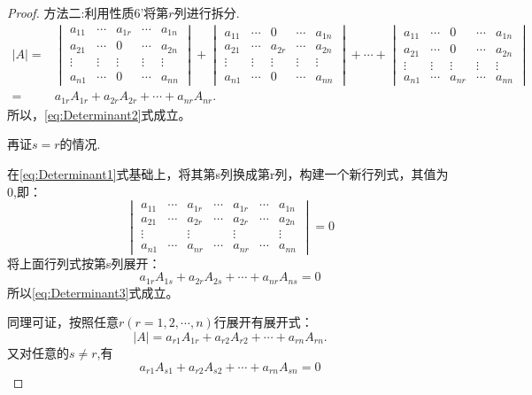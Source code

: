 \begin{proof}
  方法二:利用性质6'将第$r$列进行拆分.
  \begin{align*}
      |A| = &
    \begin{vmatrix}
    a_{11} & \cdots & a_{1r}& \cdots & a_{1n}\\
    a_{21} & \cdots & 0 & \cdots & a_{2n}\\
    \vdots & \vdots & \vdots & \vdots & \vdots\\
    a_{n1} & \cdots & 0 & \cdots &a_{nn}
    \end{vmatrix} +
    \begin{vmatrix}
    a_{11} & \cdots & 0 & \cdots & a_{1n}\\
    a_{21} & \cdots & a_{2r} & \cdots & a_{2n}\\
    \vdots & \vdots & \vdots & \vdots & \vdots\\
    a_{n1} & \cdots & 0 & \cdots &a_{nn}
  \end{vmatrix} + \cdots +
  \begin{vmatrix}
    a_{11} & \cdots & 0 & \cdots & a_{1n}\\
    a_{21} & \cdots & 0 & \cdots & a_{2n}\\
    \vdots & \vdots & \vdots & \vdots & \vdots\\
    a_{n1} & \cdots & a_{nr} & \cdots &a_{nn}
  \end{vmatrix}\\
  = & a_{1r}A_{1r}+ a_{2r}A_{2r}+\cdots+a_{nr}A_{nr}.
\end{align*}
所以，\eqref{eq:Determinant2}式成立。

再证$s=r$的情况.

在\eqref{eq:Determinant1}式基础上，将其第s列换成第r列，构建一个新行列式，其值为0,即：
\begin{equation*}
  \begin{vmatrix}
    a_{11} & \cdots & a_{1r} & \cdots & a_{1r} & \cdots & a_{1n}\\
    a_{21} & \cdots & a_{2r} & \cdots & a_{2r} & \cdots & a_{2n}\\
    \vdots && \vdots && \vdots && \vdots\\
    a_{n1} & \cdots & a_{nr} & \cdots & a_{nr} & \cdots & a_{nn}
  \end{vmatrix}=0
\end{equation*}
将上面行列式按第s列展开：
\begin{equation*}
  a_{1r}A_{1s}+a_{2r}A_{2s}+\cdots+a_{nr}A_{ns}=0
\end{equation*}
所以\eqref{eq:Determinant3}式成立。

同理可证，按照任意$r(r=1,2,\cdots,n)$行展开有展开式：
\begin{equation}
    \label{eq:Determinant4}
    |A|=a_{r1}A_{1r}+ a_{r2}A_{r2}+\cdots+a_{rn}A_{rn}.
  \end{equation}
  又对任意的$s \neq r$,有
  \begin{equation}
    \label{eq:Determinant5}
    a_{r1}A_{s1}+a_{r2}A_{s2}+\cdots+a_{rn}A_{sn}=0
  \end{equation}
\end{proof}

